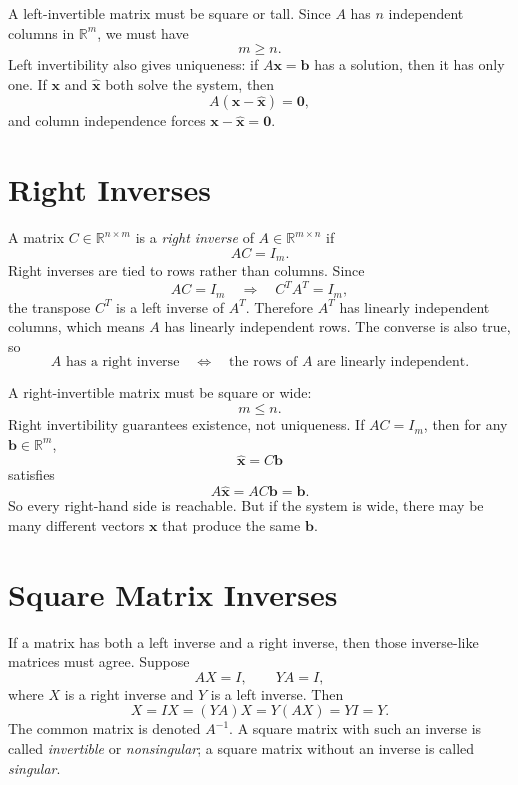A left-invertible matrix must be square or tall. Since \(A\) has \(n\) independent columns in \(\mathbb{R}^m\), we must have
\[
    m\geq n.
\]
Left invertibility also gives uniqueness: if \(A\mathbf{x}=\mathbf{b}\) has a solution, then it has only one. If \(\mathbf{x}\) and \(\widehat{\mathbf{x}}\) both solve the system, then
\[
    A(\mathbf{x}-\widehat{\mathbf{x}})=\mathbf{0},
\]
and column independence forces \(\mathbf{x}-\widehat{\mathbf{x}}=\mathbf{0}\).

\section{Right Inverses}
\label{mf:right-inverse}

A matrix \(C\in\mathbb{R}^{n\times m}\) is a \emph{right inverse} of \(A\in\mathbb{R}^{m\times n}\) if
\[
    AC=I_m.
\]
Right inverses are tied to rows rather than columns. Since
\[
    AC=I_m
    \quad\Longrightarrow\quad
    C^TA^T=I_m,
\]
the transpose \(C^T\) is a left inverse of \(A^T\). Therefore \(A^T\) has linearly independent columns, which means \(A\) has linearly independent rows. The converse is also true, so
\[
    A \text{ has a right inverse}
    \quad\Longleftrightarrow\quad
    \text{the rows of } A \text{ are linearly independent.}
\]

A right-invertible matrix must be square or wide:
\[
    m\leq n.
\]
Right invertibility guarantees existence, not uniqueness. If \(AC=I_m\), then for any \(\mathbf{b}\in\mathbb{R}^m\),
\[
    \widehat{\mathbf{x}}=C\mathbf{b}
\]
satisfies
\[
    A\widehat{\mathbf{x}}=AC\mathbf{b}=\mathbf{b}.
\]
So every right-hand side is reachable. But if the system is wide, there may be many different vectors \(\mathbf{x}\) that produce the same \(\mathbf{b}\).

\section{Square Matrix Inverses}
\label{mf:matrix-inverse}
\label{mf:inverse-uniqueness}

If a matrix has both a left inverse and a right inverse, then those inverse-like matrices must agree. Suppose
\[
    AX=I,\qquad YA=I,
\]
where \(X\) is a right inverse and \(Y\) is a left inverse. Then
\[
    X=IX=(YA)X=Y(AX)=YI=Y.
\]
The common matrix is denoted \(A^{-1}\). A square matrix with such an inverse is called \emph{invertible} or \emph{nonsingular}; a square matrix without an inverse is called \emph{singular}.

